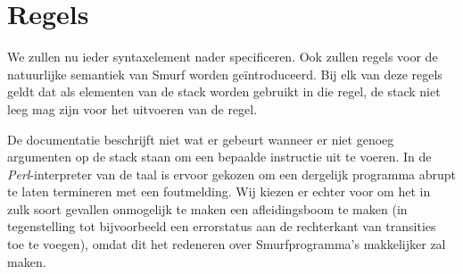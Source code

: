 \section{Regels} %
\label{sec:rules}

We zullen nu ieder syntaxelement nader specificeren. Ook zullen regels voor de
natuurlijke semantiek van Smurf worden geïntroduceerd. Bij elk van deze regels
geldt dat als elementen van de stack worden gebruikt in die regel, de stack
niet leeg mag zijn voor het uitvoeren van de regel. %

De documentatie \cite{safalra} beschrijft niet wat er gebeurt wanneer er niet
genoeg argumenten op de stack staan om een bepaalde instructie uit te voeren.
In de \emph{Perl}-interpreter van de taal is ervoor gekozen om een dergelijk
programma abrupt te laten termineren met een foutmelding.  Wij kiezen er echter
voor om het in zulk soort gevallen onmogelijk te maken een afleidingsboom te
maken (in tegenstelling tot bijvoorbeeld een errorstatus aan de rechterkant van
transities toe te voegen), omdat dit het redeneren over Smurfprogramma's
makkelijker zal maken.













